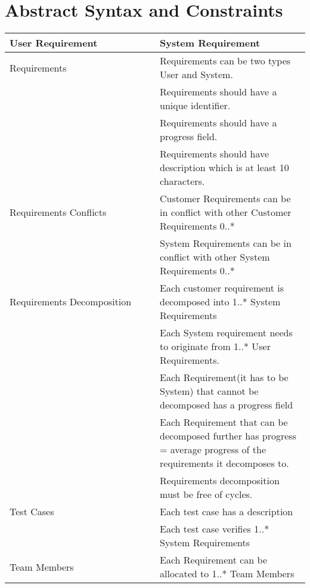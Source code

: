 \documentclass[11pt,a4paper]{scrartcl}
\begin{document}
\section{Abstract Syntax and Constraints}



\begin{center}
	
	\begin{longtable}{| p{0.5\linewidth} | p{0.5\linewidth} |}
	\hline
	\textbf{User Requirement} & \textbf{System Requirement} \\ \hline
	
	Requirements 
	& Requirements can be two types User and System. \\ \hline
	& Requirements should have a unique identifier. \\ \hline
	& Requirements should have a progress  field. \\ \hline
	& Requirements should have description which is at least 10 characters. \\ \hline
	
	Requirements Conflicts 
	& Customer Requirements can be in conflict with other Customer Requirements 0..* \\ \hline
	& System Requirements can be in conflict with other System Requirements 0..* \\ \hline
	
	Requirements Decomposition 
	& Each customer requirement is decomposed into 1..* System Requirements\\ \hline
	& Each System requirement needs to originate from 1..* User Requirements. \\ \hline
	& Each Requirement(it has to be System) that cannot be decomposed has a progress field \\ \hline
	& Each Requirement that can be decomposed further has progress = average progress of the requirements it decomposes to. \\ \hline
	& Requirements decomposition must be free of cycles. \\ \hline
	
	Test Cases
	& Each test case has a description \\ \hline
	& Each test case verifies 1..* System Requirements \\ \hline
	
	Team Members
	& Each Requirement can be allocated to 1..* Team Members\\ \hline
	
	
	\hline
\end{longtable}
\end{center}	
\end{document}
